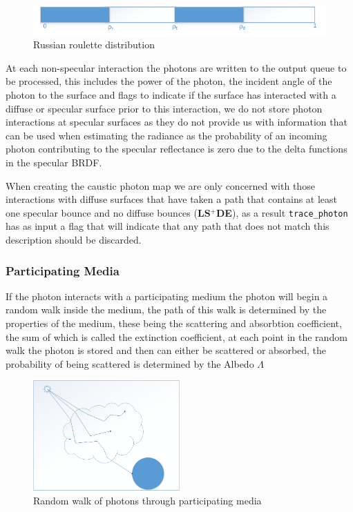 \begin{figure}[h]
\includegraphics{./images/russian_roulette_distribution.png}
\caption{Russian roulette distribution}
\label{fig:rr_dist}
\end{figure}

At each non-specular interaction the photons are written to the output queue to be processed, this includes
the power of the photon, the incident angle of the photon to the surface and flags to indicate if the surface
has interacted with a diffuse or specular surface prior to this interaction, we do not store photon interactions
at specular surfaces as they do not provide us with information that can be used when estimating the radiance as
the probability of an incoming photon contributing to the specular reflectance is zero due to the delta functions
in the specular BRDF.

When creating the caustic photon map we are only concerned with those interactions with diffuse surfaces that have
taken a path that contains at least one specular bounce and no diffuse bounces (\textbf{LS$^+$DE}), as a result \texttt{trace\_photon}
has as input a flag that will indicate that any path that does not match this description should be discarded.

\subsubsection{Participating Media}
If the photon interacts with a participating medium the photon will begin a random walk inside the medium, the path of this walk
is determined by the properties of the medium, these being the scattering and absorbtion coefficient, the sum of which
is called the extinction coefficient, at each point in the random walk the photon is stored and then can either be
scattered or absorbed, the probability of being scattered is determined by the Albedo $\Lambda$

\begin{figure}
\centering
\includegraphics[width=0.5\textwidth]{./images/random_walk.png}
\caption{Random walk of photons through participating media}
\label{fig:random_walk}
\end{figure}

